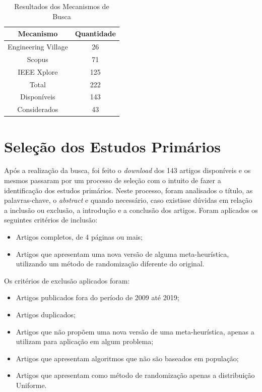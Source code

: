 \begin{table}[!htpb]
    \centering
    \begin{tabular}{c|c} %
      \textbf{Mecanismo} & \textbf{Quantidade} \\
      \hline
      Engineering Village & 26\\
      Scopus & 71\\
      IEEE Xplore & 125\\
      \hline
      Total & 222\\
      Disponíveis & 143\\
      Considerados & 43\\
    \end{tabular}
    \caption{Resultados dos Mecanismos de Busca}
    \label{tab:resultado}
\end{table}

\section{Seleção dos Estudos Primários}

Após a realização da busca, foi feito o \textit{download} dos 143 artigos disponíveis e os mesmos passaram por um processo de seleção com o intuito de fazer a identificação dos estudos primários. Neste processo, foram analisados o título, as palavras-chave, o \textit{abstract} e quando necessário, caso existisse dúvidas em relação a inclusão ou exclusão, a introdução e a conclusão dos artigos. Foram aplicados os seguintes critérios de inclusão:

\begin{itemize}
    \item Artigos completos, de 4 páginas ou mais;
    \item Artigos que apresentam uma nova versão de alguma meta-heurística, utilizando um método de randomização diferente do original.
\end{itemize}


Os critérios de exclusão aplicados foram:

\begin{itemize}
    \item Artigos publicados fora do período de 2009 até 2019;
    \item Artigos duplicados;
    \item Artigos que não propõem uma nova versão de uma meta-heurística, apenas a utilizam para aplicação em algum problema;
    \item Artigos que apresentam algoritmos que não são baseados em população;
    \item Artigos que apresentam como método de randomização apenas a distribuição Uniforme.
\end{itemize}

